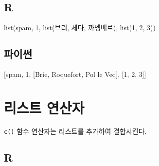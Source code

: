 \documentclass[
  letterpaper,
]{book}
\newenvironment{Shaded}{\begin{snugshade}}{\end{snugshade}}
\newcommand{\DecValTok}[1]{\textcolor[rgb]{0.68,0.00,0.00}{#1}}
\newcommand{\FunctionTok}[1]{\textcolor[rgb]{0.28,0.35,0.67}{#1}}
\newcommand{\NormalTok}[1]{\textcolor[rgb]{0.00,0.23,0.31}{#1}}
\newcommand{\StringTok}[1]{\textcolor[rgb]{0.13,0.47,0.30}{#1}}
\begin{document}
\subsection*{R}\label{r-52}

\begin{Shaded}
\begin{Highlighting}[]
\FunctionTok{list}\NormalTok{(}\StringTok{\textquotesingle{}spam\textquotesingle{}}\NormalTok{, }\DecValTok{1}\NormalTok{, }\FunctionTok{list}\NormalTok{(}\StringTok{\textquotesingle{}브리\textquotesingle{}}\NormalTok{, }\StringTok{\textquotesingle{}체다\textquotesingle{}}\NormalTok{, }\StringTok{\textquotesingle{}까멩베르\textquotesingle{}}\NormalTok{), }\FunctionTok{list}\NormalTok{(}\DecValTok{1}\NormalTok{, }\DecValTok{2}\NormalTok{, }\DecValTok{3}\NormalTok{))}
\end{Highlighting}
\end{Shaded}

\subsection*{파이썬}\label{uxd30cuxc774uxc36c-52}

\begin{Shaded}
\begin{Highlighting}[]
\NormalTok{[}\StringTok{\textquotesingle{}spam\textquotesingle{}}\NormalTok{, }\DecValTok{1}\NormalTok{, [}\StringTok{\textquotesingle{}Brie\textquotesingle{}}\NormalTok{, }\StringTok{\textquotesingle{}Roquefort\textquotesingle{}}\NormalTok{, }\StringTok{\textquotesingle{}Pol le Veq\textquotesingle{}}\NormalTok{], [}\DecValTok{1}\NormalTok{, }\DecValTok{2}\NormalTok{, }\DecValTok{3}\NormalTok{]]}
\end{Highlighting}
\end{Shaded}

\section{리스트 연산자}\label{r-list-operator}


\texttt{c()} 함수 연산자는 리스트를 추가하여 결합시킨다.
 

\subsection{R}
\end{document}
